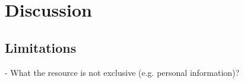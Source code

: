 \section*{Discussion}



\subsection*{Limitations}

- What the resource is not exclusive (e.g. personal information)?

